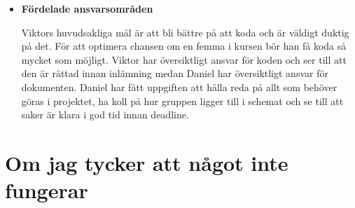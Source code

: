 \documentclass{mall}
\begin{document}
\begin{itemize}
\item \textbf{Fördelade ansvarsområden}
  
  Viktors huvudsakliga mål är att bli bättre på att koda och är väldigt duktig på det. För att optimera chansen om en femma i kursen bör han få koda så mycket som möjligt. Viktor har översiktligt ansvar för koden och ser till att den är rättad innan inlämning medan Daniel har översiktligt ansvar för dokumenten. Daniel har fått uppgiften att hålla reda på allt som behöver göras i projektet, ha koll på hur gruppen ligger till i schemat och se till att saker är klara i god tid innan deadline. 

\end{itemize}

\section{Om jag tycker att något inte fungerar}
\end{document}
